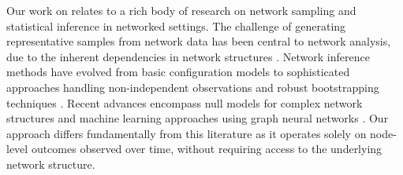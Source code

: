 Our work on \batching{} relates to a rich body of research on network sampling and statistical inference in networked settings. The challenge of generating representative samples from network data has been central to network analysis, due to the inherent dependencies in network structures \citep{wormald1999models,newman2018networks}. Network inference methods have evolved from basic configuration models \citep{bollobas1980probabilistic} to sophisticated approaches handling non-independent observations \citep{snijders1999non,bickel2009nonparametric} and robust bootstrapping techniques \citep{bhattacharyya2015subsampling,green2022bootstrapping}. Recent advances encompass null models for complex network structures \citep{karrer2011stochastic,bianconi2018multilayer} and machine learning approaches using graph neural networks \citep{kipf2017semisupervised,hamilton2020graph}. Our approach differs fundamentally from this literature as it operates solely on node-level outcomes observed over time, without requiring access to the underlying network structure.